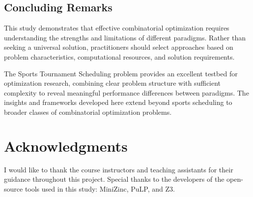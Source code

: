 \documentclass[11pt]{article}
\begin{document}
\subsection{Concluding Remarks}

This study demonstrates that effective combinatorial optimization requires understanding the strengths and limitations of different paradigms. Rather than seeking a universal solution, practitioners should select approaches based on problem characteristics, computational resources, and solution requirements.

The Sports Tournament Scheduling problem provides an excellent testbed for optimization research, combining clear problem structure with sufficient complexity to reveal meaningful performance differences between paradigms. The insights and frameworks developed here extend beyond sports scheduling to broader classes of combinatorial optimization problems.

\section*{Acknowledgments}

I would like to thank the course instructors and teaching assistants for their guidance throughout this project. Special thanks to the developers of the open-source tools used in this study: MiniZinc, PuLP, and Z3.
\end{document}
